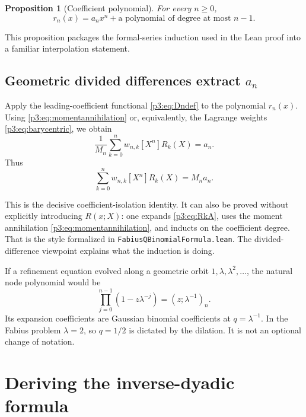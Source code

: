 \documentclass[11pt,oneside]{article}
\newtheorem{proposition}[theorem]{Proposition}
\theoremstyle{definition}
\theoremstyle{remark}
\newcommand{\qpoch}[3]{\left(#1;#2\right)_{#3}}
\newcommand{\coeff}[2]{\left[#1^{#2}\right]}
\begin{document}
\begin{proposition}[Coefficient polynomial]\label{p3:prop:coefficientpoly}
For every $n\ge0$,
\[
 r_n(x)=a_nx^n+\text{a polynomial of degree at most }n-1.
\]
\end{proposition}

This proposition packages the formal-series induction used in the Lean proof into a familiar interpolation statement.

\subsection{Geometric divided differences extract \texorpdfstring{$a_n$}{a[n]}}

Apply the leading-coefficient functional \eqref{p3:eq:Dndef} to the polynomial $r_n(x)$.  Using \eqref{p3:eq:momentannihilation} or, equivalently, the Lagrange weights \eqref{p3:eq:barycentric}, we obtain
\begin{equation}\label{p3:eq:extractan}
 \frac1{M_n}\sum_{k=0}^{n}w_{n,k}
 \coeff{X}{n}R_k(X)=a_n.
\end{equation}
Thus
\begin{equation}\label{p3:eq:weightedR}
 \boxed{
 \sum_{k=0}^{n}w_{n,k}\coeff{X}{n}R_k(X)=M_na_n.}
\end{equation}

This is the decisive coefficient-isolation identity.  It can also be proved without explicitly introducing $R(x;X)$: one expands \eqref{p3:eq:RkA}, uses the moment annihilation \eqref{p3:eq:momentannihilation}, and inducts on the coefficient degree.  That is the style formalized in \texttt{FabiusQBinomialFormula.lean}.  The divided-difference viewpoint explains what the induction is doing.

\begin{greenbox}
If a refinement equation evolved along a geometric orbit $1,\lambda,\lambda^2,\ldots$, the natural node polynomial would be
\[
 \prod_{j=0}^{n-1}(1-z\lambda^{-j})
   =\qpoch{z}{\lambda^{-1}}{n}.
\]
Its expansion coefficients are Gaussian binomial coefficients at $q=\lambda^{-1}$.  In the Fabius problem $\lambda=2$, so $q=1/2$ is dictated by the dilation.  It is not an optional change of notation.
\end{greenbox}


\section{Deriving the inverse-dyadic formula}
\end{document}
